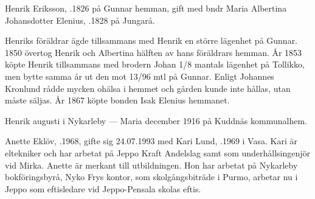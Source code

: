 Henrik Eriksson, .1826 på Gunnar hemman, gift med bndr Maria Albertina Johansdotter Elenius, .1828 på Jungarå.
\begin{jhchildren}
  \item {}
  \item {}
  \item {}
  \item {}
  \item {}
  \item {}
  \item {}
  \item {}
  \item {}
  \item {}
\end{jhchildren}

Henriks föräldrar ägde tillsammans med Henrik en större lägenhet på Gunnar. 1850 övertog Henrik och Albertina hälften av hans föräldrars hemman. År 1853 köpte Henrik tillsammans med brodern Johan 1/8 mantals lägenhet på Tollikko, men bytte samma år ut den mot 13/96 mtl på Gunnar. Enligt Johannes Kronlund rådde mycken ohälsa i hemmet och gården kunde inte hållas, utan måste säljas. År 1867 köpte bonden Isak Elenius hemmanet.

Henrik  augusti i Nykarleby  ---  Maria  december 1916 på Kuddnäs kommunalhem.






Anette Eklöv, .1968, gifte sig 24.07.1993 med Kari Lund, .1969 i Vasa. Kari är eltekniker och har arbetat på Jeppo Kraft Andelslag samt som underhållsingenjör vid Mirka. Anette är merkant till utbildningen. Hon 	har arbetat på Nykarleby bokföringsbyrå, Nyko Frys kontor, som skolgångsbiträde i Purmo, arbetar nu i Jeppo som eftisledare vid Jeppo-Pensala skolas eftis.
\begin{jhchildren}
  \item {}
  \item {}
  \item {}
\end{jhchildren}

